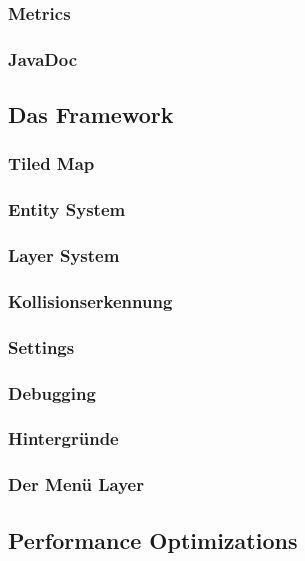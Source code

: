 		\subsubsection{Metrics}						
		\subsubsection{JavaDoc}						
	\subsection{Das Framework}
		\subsubsection{Tiled Map}					
		\subsubsection{Entity System}				
		\subsubsection{Layer System}				
		\subsubsection{Kollisionserkennung}			
		\subsubsection{Settings}					
		\subsubsection{Debugging}					
		\subsubsection{Hintergründe}				
		\subsubsection{Der Menü Layer}				
	\subsection{Performance Optimizations}			
